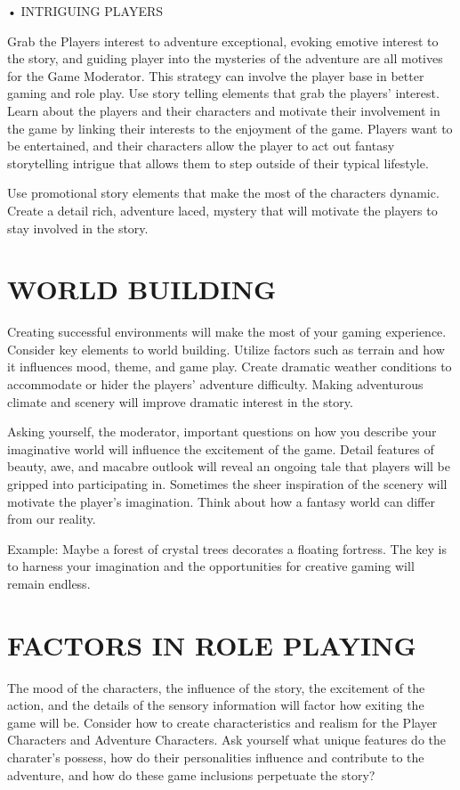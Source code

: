 \documentclass{article}
\begin{document}
• INTRIGUING PLAYERS

	Grab the Players interest to adventure exceptional, evoking emotive interest to the story, and
guiding player into the mysteries of the adventure are all motives for the Game Moderator.
This strategy can involve the player base in better gaming and role play. Use story telling
elements that grab the players’ interest. Learn about the players and their characters and motivate
their involvement in the game by linking their interests to the enjoyment of the game.
Players want to be entertained, and their characters allow the player to act out fantasy storytelling
intrigue that allows them to step outside of their typical lifestyle.

	Use promotional story elements that make the most of the characters dynamic. Create a detail
rich, adventure laced, mystery that will motivate the players to stay involved in the story.

\section{WORLD BUILDING}

	Creating successful environments will make the most of your gaming experience.
Consider key elements to world building. Utilize factors such as terrain and how it influences
mood, theme, and game play. Create dramatic weather conditions to accommodate or hider the
players’ adventure difficulty. Making adventurous climate and scenery will improve dramatic
interest in the story.

	Asking yourself, the moderator, important questions on how you describe your imaginative
world will influence the excitement of the game. Detail features of beauty, awe, and macabre
outlook will reveal an ongoing tale that players will be gripped into participating in.
Sometimes the sheer inspiration of the scenery will motivate the player’s imagination. Think
about how a fantasy world can differ from our reality.

Example: Maybe a forest of crystal trees decorates a floating fortress. The key is to harness your
imagination and the opportunities for creative gaming will remain endless.

\section{FACTORS IN ROLE PLAYING}

	The mood of the characters, the influence of the story, the excitement of the action, and
the details of the sensory information will factor how exiting the game will be. Consider how to
create characteristics and realism for the Player Characters and Adventure Characters. Ask
yourself what unique features do the charater’s possess, how do their personalities influence and
contribute to the adventure, and how do these game inclusions perpetuate the story?
\end{document}
